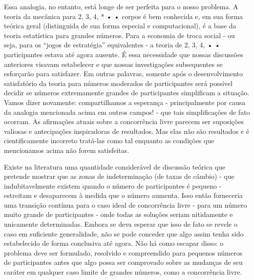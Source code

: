 \documentclass[12pt]{article}
\begin{document}
Essa analogia, no entanto, está longe de ser perfeita para o nosso problema. A teoria da mecânica para 2, 3, 4, * • • corpos é bem conhecida e, em sua forma teórica geral (distinguida de sua forma especial e computacional), é a base da teoria estatística para grandes números. Para a economia de troca social - ou seja, para os “jogos de estratégia” equivalentes - a teoria de 2, 3, 4, • • participantes estava até agora ausente. É essa necessidade que nossas discussões anteriores visavam estabelecer e que nossas investigações subsequentes se esforçarão para satisfazer. Em outras palavras, somente após o desenvolvimento satisfatório da teoria para números moderados de participantes será possível decidir se números extremamente grandes de participantes simplificam a situação. Vamos dizer novamente: compartilhamos a esperança - principalmente por causa da analogia mencionada acima em outros campos! - que tais simplificações de fato ocorram. As afirmações atuais sobre a concorrência livre parecem ser suposições valiosas e antecipações inspiradoras de resultados. Mas elas não são resultados e é cientificamente incorreto tratá-las como tal enquanto as condições que mencionamos acima não forem satisfeitas.

Existe na literatura uma quantidade considerável de discussão teórica que pretende mostrar que as zonas de indeterminação (de taxas de câmbio) - que indubitavelmente existem quando o número de participantes é pequeno - estreitam e desaparecem à medida que o número aumenta. Isso então forneceria uma transição contínua para o caso ideal de concorrência livre - para um número muito grande de participantes - onde todas as soluções seriam nitidamente e unicamente determinadas. Embora se deva esperar que isso de fato se revele o caso em suficiente generalidade, não se pode conceder que algo assim tenha sido estabelecido de forma conclusiva até agora. Não há como escapar disso: o problema deve ser formulado, resolvido e compreendido para pequenos números de participantes antes que algo possa ser comprovado sobre as mudanças de seu caráter em qualquer caso limite de grandes números, como a concorrência livre.
\end{document}
